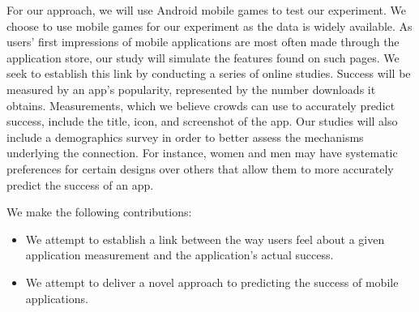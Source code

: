 For our approach, we will use Android mobile games to test our experiment. We choose to use mobile games for our experiment as the data is widely available. As users' first impressions of mobile applications are most often made through the application store, our study will simulate the features found on such pages. We seek to establish this link by conducting a series of online studies. Success will be measured by an app's popularity, represented by the number downloads it obtains. Measurements, which we believe crowds can use to accurately predict success, include the title, icon, and screenshot of the app. Our studies will also include a demographics survey in order to better assess the mechanisms underlying the connection. For instance, women and men may have systematic preferences for certain designs over others that allow them to more accurately predict the success of an app.

We make the following contributions:
\begin{itemize}
\item We attempt to establish a link between the way users feel about a given application measurement and the application's actual success.
\item We attempt to deliver a novel approach to predicting the success of mobile applications.
\end{itemize}
